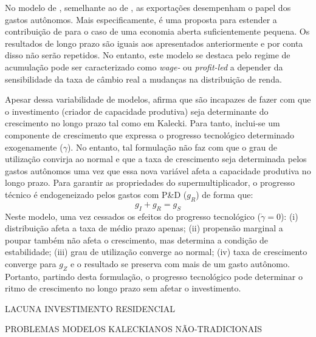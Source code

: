 No modelo de \textcite{nah_long-run_2017}, semelhante ao de \textcite{dejuan_hidden_2017}, as exportações desempenham o papel dos gastos autônomos. Mais especificamente, é uma proposta para estender a contribuição de \textcite{serrano_sraffian_1995} para o caso de uma economia aberta suficientemente pequena. Os resultados de longo prazo são iguais aos apresentados anteriormente e por conta disso não serão repetidos. No entanto, este modelo se destaca pelo regime de acumulação pode ser caracterizado como \textit{wage-} ou \textit{profit-led} a depender da sensibilidade da taxa de câmbio real a mudanças na distribuição de renda. 

Apesar dessa variabilidade de modelos, \textcite{dutt_observations_2018} afirma que são incapazes de fazer com que o investimento (criador de capacidade produtiva) seja determinante do crescimento no longo prazo tal como em Kalecki. Para tanto, inclui-se um componente de crescimento que expressa o progresso tecnológico determinado exogenamente ($\gamma$). No entanto, tal formulação não faz com que o grau de utilização convirja ao normal e que a taxa de crescimento seja determinada pelos gastos autônomos uma vez que essa nova variável afeta a capacidade produtiva no longo prazo. Para garantir as propriedades do supermultiplicador, o progresso técnico é endogeneizado pelos gastos com P\&D ($g_R$) de forma que:
$$
g_I + g_R = g_S
$$
Neste modelo, uma vez cessados os efeitos do progresso tecnológico ($\dot \gamma = 0$): 
	(i) distribuição afeta a taxa de médio prazo apenas; 
	(ii) propensão marginal a poupar também não afeta o crescimento, mas determina a condição de estabilidade; 
	(iii) grau de utilização converge ao normal; 
	(iv) taxa de crescimento converge para $g_Z$ e o resultado se preserva com mais de um gasto autônomo. Portanto, partindo desta formulação, o progresso tecnológico pode determinar o ritmo de crescimento no longo prazo sem afetar o investimento.


LACUNA INVESTIMENTO RESIDENCIAL


PROBLEMAS MODELOS KALECKIANOS NÃO-TRADICIONAIS

